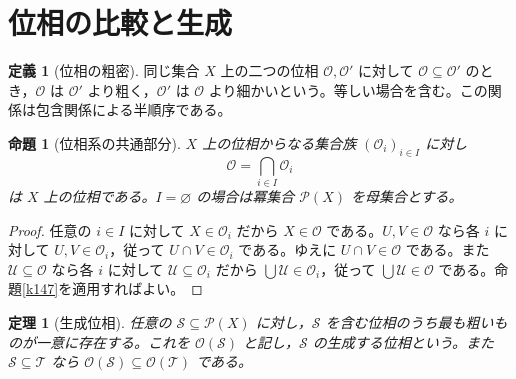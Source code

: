 \documentclass[a5paper,10pt,dvipdfmx]{jsarticle}
\theoremstyle{definition}
\newtheorem{defn}[ruledef]{定義}
\theoremstyle{plain}
\newtheorem{prop}[ruledef]{命題}
\newtheorem{thm}[ruledef]{定理}
\newcommand{\Pow}{\mathcal{P}}
\begin{document}
\section{位相の比較と生成}
\begin{defn}[位相の粗密]\label{k152}
同じ集合 $X$ 上の二つの位相 $\mathcal{O},\mathcal{O}'$ に対して $\mathcal{O}\subseteq\mathcal{O}'$ のとき，$\mathcal{O}$ は $\mathcal{O}'$ より粗く，$\mathcal{O}'$ は $\mathcal{O}$ より細かいという。等しい場合を含む。この関係は包含関係による半順序である。
\end{defn}
\begin{prop}[位相系の共通部分]\label{k153}
$X$ 上の位相からなる集合族 $(\mathcal{O}_i)_{i\in I}$ に対し
\[\mathcal{O}=\bigcap_{i\in I}\mathcal{O}_i\]
は $X$ 上の位相である。$I=\varnothing$ の場合は冪集合 $\Pow(X)$ を母集合とする。
\end{prop}
\begin{proof}
任意の $i\in I$ に対して $X\in\mathcal{O}_i$ だから $X\in\mathcal{O}$ である。$U,V\in\mathcal{O}$ なら各 $i$ に対して $U,V\in\mathcal{O}_i$，従って $U\cap V\in\mathcal{O}_i$ である。ゆえに $U\cap V\in\mathcal{O}$ である。また $\mathcal U\subseteq\mathcal{O}$ なら各 $i$ に対して $\mathcal U\subseteq\mathcal{O}_i$ だから $\bigcup\mathcal U\in\mathcal{O}_i$，従って $\bigcup\mathcal U\in\mathcal{O}$ である。命題\ref{k147}を適用すればよい。
\end{proof}
\begin{thm}[生成位相]\label{k154}
任意の $\mathcal S\subseteq\Pow(X)$ に対し，$\mathcal S$ を含む位相のうち最も粗いものが一意に存在する。これを $\mathcal{O}(\mathcal S)$ と記し，$\mathcal S$ の生成する位相という。また $\mathcal S\subseteq\mathcal T$ なら $\mathcal{O}(\mathcal S)\subseteq\mathcal{O}(\mathcal T)$ である。
\end{thm}
\end{document}
